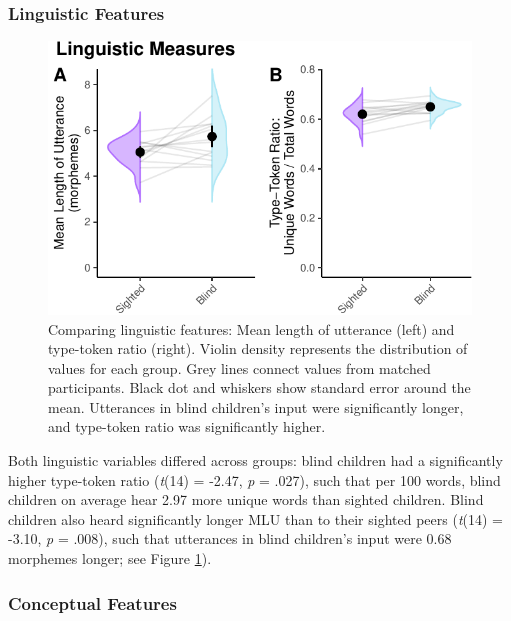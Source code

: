 \documentclass[
  man]{apa6}
\begin{document}
\hypertarget{linguistic-features-1}{%
\subsubsection{Linguistic Features}\label{linguistic-features-1}}

\begin{figure}
\centering
\includegraphics{input_quality_manuscript_files/figure-latex/linguistic-plots-1.pdf}
\caption{\label{fig:linguistic-plots}Comparing linguistic features: Mean length of utterance (left) and type-token ratio (right). Violin density represents the distribution of values for each group. Grey lines connect values from matched participants. Black dot and whiskers show standard error around the mean. Utterances in blind children's input were significantly longer, and type-token ratio was significantly higher.}
\end{figure}

Both linguistic variables differed across groups: blind children had a significantly higher type-token ratio (\emph{t}(14) = -2.47, \emph{p} = .027), such that per 100 words, blind children on average hear 2.97 more unique words than sighted children. Blind children also heard significantly longer MLU than to their sighted peers (\emph{t}(14) = -3.10, \emph{p} = .008), such that utterances in blind children's input were 0.68 morphemes longer; see Figure \ref{fig:linguistic-plots}).

\hypertarget{conceptual-features-1}{%
\subsubsection{Conceptual Features}\label{conceptual-features-1}}
\end{document}
